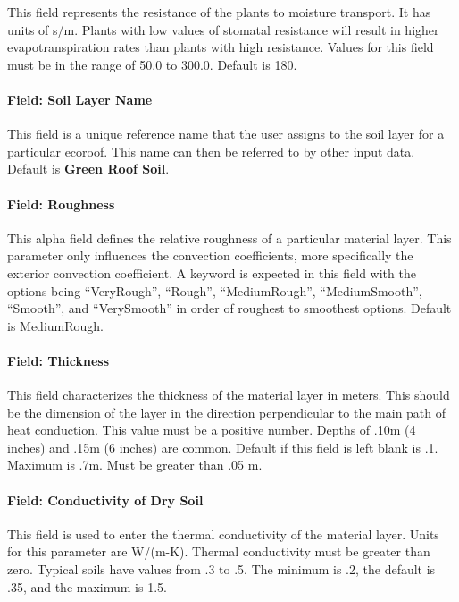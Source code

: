 This field represents the resistance of the plants to moisture transport. It has units of s/m. Plants with low values of stomatal resistance will result in higher evapotranspiration rates than plants with high resistance. Values for this field must be in the range of 50.0 to 300.0. Default is 180.

\paragraph{Field: Soil Layer Name}\label{field-soil-layer-name}

This field is a unique reference name that the user assigns to the soil layer for a particular ecoroof. This name can then be referred to by other input data. Default is \textbf{Green Roof Soil}.

\paragraph{Field: Roughness}\label{field-roughness-2}

This alpha field defines the relative roughness of a particular material layer. This parameter only influences the convection coefficients, more specifically the exterior convection coefficient. A keyword is expected in this field with the options being ``VeryRough'', ``Rough'', ``MediumRough'', ``MediumSmooth'', ``Smooth'', and ``VerySmooth'' in order of roughest to smoothest options. Default is MediumRough.

\paragraph{Field: Thickness}\label{field-thickness-9}

This field characterizes the thickness of the material layer in meters. This should be the dimension of the layer in the direction perpendicular to the main path of heat conduction. This value must be a positive number. Depths of .10m (4 inches) and .15m (6 inches) are common. Default if this field is left blank is .1. Maximum is .7m. Must be greater than .05 m.

\paragraph{Field: Conductivity of Dry Soil}\label{field-conductivity-of-dry-soil}

This field is used to enter the thermal conductivity of the material layer. Units for this parameter are W/(m-K). Thermal conductivity must be greater than zero. Typical soils have values from .3 to .5. The minimum is .2, the default is .35, and the maximum is 1.5.

